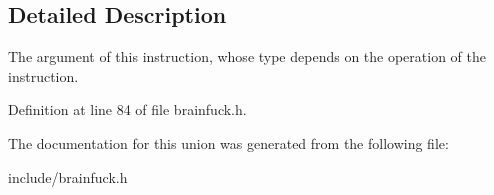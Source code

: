 \subsection{Detailed Description}
The argument of this instruction, whose type depends on the operation of the instruction. 

Definition at line 84 of file brainfuck.\+h.



The documentation for this union was generated from the following file\+:\begin{DoxyCompactItemize}
\item 
include/brainfuck.\+h\end{DoxyCompactItemize}
